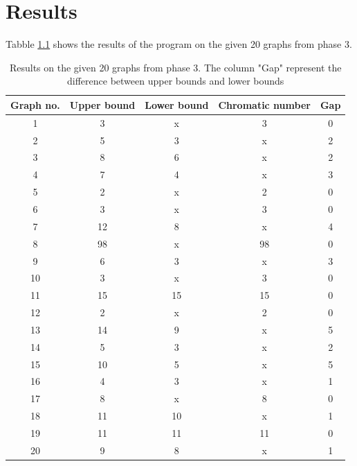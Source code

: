 \documentclass[a4paper]{report}
\begin{document}
	\chapter{Results}
		Tabble \ref{tab:result} shows the results of the program on the given 20 graphs from phase 3.
		\begin{table} [h!]
		\begin{center}
			\begin{tabular}{| c | c | c | c |c|}
				\hline
				Graph no. & Upper bound & Lower bound & Chromatic number & Gap \\
				\hline
				1 & 3 & x & 3 & 0\\
				\hline
				2 & 5 & 3 & x & 2\\
				\hline
				3 & 8 & 6 & x & 2\\
				\hline
				4 & 7 & 4 & x & 3\\
				\hline
				5 & 2 & x & 2 & 0\\
				\hline
				6 & 3 & x & 3 & 0\\
				\hline
				7 & 12 & 8 & x & 4\\
				\hline
				8 & 98 & x & 98 & 0\\
				\hline
				9 & 6 & 3 & x & 3\\
				\hline
				10 & 3 & x & 3 & 0\\
				\hline
				11 & 15 & 15 & 15 & 0\\
				\hline
				12 & 2 & x & 2 & 0\\
				\hline
				13 & 14 & 9 & x & 5\\
				\hline
				14 & 5 & 3 & x & 2\\
				\hline
				15 & 10 & 5 & x & 5\\
				\hline
				16 & 4 & 3 & x & 1\\
				\hline
				17 & 8 & x & 8 & 0\\
				\hline
				18 & 11 & 10 & x & 1\\
				\hline
				19 & 11 & 11 & 11 & 0\\
				\hline
				20 & 9 & 8 & x & 1\\
				\hline
			\end{tabular}
		\end{center}
		\caption{Results on the given 20 graphs from phase 3. The column "Gap" represent the difference between upper bounds and lower bounds}
		\label{tab:result}
	\end{table}
	
\end{document}
